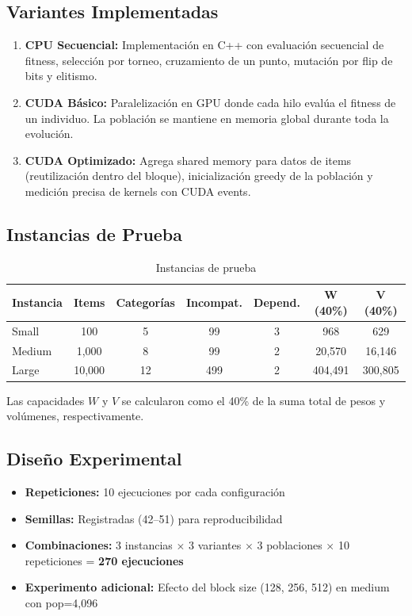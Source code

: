 \documentclass[12pt,a4paper]{article}
\begin{document}
\subsection{Variantes Implementadas}

\begin{enumerate}
  \item \textbf{CPU Secuencial:} Implementaci\'on en C++ con evaluaci\'on secuencial de fitness, selecci\'on por torneo, cruzamiento de un punto, mutaci\'on por flip de bits y elitismo.
  \item \textbf{CUDA B\'asico:} Paralelizaci\'on en GPU donde cada hilo eval\'ua el fitness de un individuo. La poblaci\'on se mantiene en memoria global durante toda la evoluci\'on.
  \item \textbf{CUDA Optimizado:} Agrega shared memory para datos de items (reutilizaci\'on dentro del bloque), inicializaci\'on greedy de la poblaci\'on y medici\'on precisa de kernels con CUDA events.
\end{enumerate}

\subsection{Instancias de Prueba}

\begin{table}[H]
\centering
\caption{Instancias de prueba}
\begin{tabular}{lcccccc}
\toprule
\textbf{Instancia} & \textbf{Items} & \textbf{Categor\'ias} & \textbf{Incompat.} & \textbf{Depend.} & \textbf{W (40\%)} & \textbf{V (40\%)} \\
\midrule
Small & 100 & 5 & 99 & 3 & 968 & 629 \\
Medium & 1,000 & 8 & 99 & 2 & 20,570 & 16,146 \\
Large & 10,000 & 12 & 499 & 2 & 404,491 & 300,805 \\
\bottomrule
\end{tabular}
\end{table}

Las capacidades $W$ y $V$ se calcularon como el 40\% de la suma total de pesos y vol\'umenes, respectivamente.

\subsection{Dise\~no Experimental}

\begin{itemize}
  \item \textbf{Repeticiones:} 10 ejecuciones por cada configuraci\'on
  \item \textbf{Semillas:} Registradas (42--51) para reproducibilidad
  \item \textbf{Combinaciones:} 3 instancias $\times$ 3 variantes $\times$ 3 poblaciones $\times$ 10 repeticiones = \textbf{270 ejecuciones}
  \item \textbf{Experimento adicional:} Efecto del block size (128, 256, 512) en medium con pop=4,096
\end{itemize}
\end{document}
